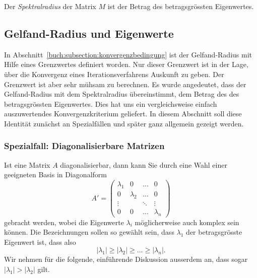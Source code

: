 \begin{definition}
\label{buch:definition:spektralradius}
Der {\em Spektralradius} der Matrix $M$ ist der Betrag des betragsgrössten
Eigenwertes.
\end{definition}

%
%
\subsection{Gelfand-Radius und Eigenwerte
\label{buch:subsection:spektralradius}}
In Abschnitt~\ref{buch:subsection:konvergenzbedingung}
ist der Gelfand-Radius mit Hilfe eines Grenzwertes definiert worden.
%
Nur dieser Grenzwert ist in der Lage, über die Konvergenz eines 
Iterationsverfahrens Auskunft zu geben.
Der Grenzwert ist aber sehr mühsam zu berechnen.
%
Es wurde angedeutet, dass der Gelfand-Radius mit dem Spektralradius
übereinstimmt, dem Betrag des des betragsgrössten Eigenwertes.
Dies hat uns ein vergleichsweise einfach auszuwertendes Konvergenzkriterium
geliefert.
%
In diesem Abschnitt soll diese Identität zunächst an Spezialfällen
und später ganz allgemein gezeigt werden.

\subsubsection{Spezialfall: Diagonalisierbare Matrizen}
Ist eine Matrix $A$ diagonalisierbar, dann kann Sie durch eine Wahl
einer geeigneten Basis in Diagonalform
%
%
\[
A'
=
\begin{pmatrix}
\lambda_1&        0&\dots &0\\
0        &\lambda_2&\dots &0\\
\vdots   &         &\ddots&\vdots\\
0        &        0&\dots &\lambda_n
\end{pmatrix}
\]
gebracht werden, wobei die Eigenwerte $\lambda_i$  möglicherweise auch
komplex sein können.
%
Die Bezeichnungen sollen so gewählt sein, dass $\lambda_1$ der
betragsgrösste Eigenwert ist, dass also
\[
|\lambda_1| \ge |\lambda_2| \ge \dots \ge |\lambda_n|.
\]
Wir nehmen für die folgende, einführende Diskussion ausserdem an, dass
sogar $|\lambda_1|>|\lambda_2|$ gilt.

